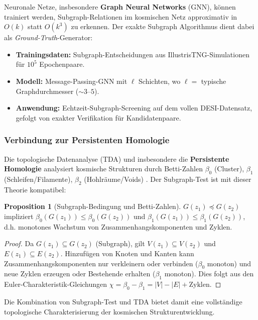 ﻿\documentclass[a4paper,12pt]{article}
\theoremstyle{definition}
\newtheorem{proposition}{Proposition}[section]
\theoremstyle{remark}
\begin{document}
Neuronale Netze, insbesondere \textbf{Graph Neural Networks} (GNN),
können trainiert werden, Subgraph-Relationen im kosmischen Netz
approximativ in $O(k)$ statt $O(k^3)$ zu erkennen. Der exakte
Subgraph Algorithmus dient dabei als \textit{Ground-Truth}-Generator:

\begin{itemize}
  \item \textbf{Trainingsdaten:} Subgraph-Entscheidungen aus IllustrisTNG-Simulationen
    für $10^5$ Epochenpaare.
  \item \textbf{Modell:} Message-Passing-GNN mit $\ell$ Schichten, wo
    $\ell = $ typische Graphdurchmesser ($\sim 3$--$5$).
  \item \textbf{Anwendung:} Echtzeit-Subgraph-Screening auf dem vollen
    DESI-Datensatz, gefolgt von exakter Verifikation für Kandidatenpaare.
\end{itemize}

\subsubsection*{Verbindung zur Persistenten Homologie}

Die topologische Datenanalyse (TDA) und insbesondere die
\textbf{Persistente Homologie} analysiert kosmische Strukturen
durch Betti-Zahlen $\beta_0$ (Cluster), $\beta_1$ (Schleifen/Filamente),
$\beta_2$ (Hohlräume/Voids) \cite{weinberg2013}. Der Subgraph-Test
ist mit dieser Theorie kompatibel:

\begin{proposition}[Subgraph-Bedingung und Betti-Zahlen]
  $G(z_1) \preceq G(z_2)$ impliziert
  $\beta_0(G(z_1)) \leq \beta_0(G(z_2))$ und
  $\beta_1(G(z_1)) \leq \beta_1(G(z_2))$, d.h. monotones Wachstum
  von Zusammenhangskomponenten und Zyklen.
\end{proposition}

\begin{proof}
  Da $G(z_1) \subseteq G(z_2)$ (Subgraph), gilt $V(z_1) \subseteq V(z_2)$
  und $E(z_1) \subseteq E(z_2)$. Hinzufügen von Knoten und Kanten kann
  Zusammenhangskomponenten nur verkleinern oder verbinden ($\beta_0$
  monoton) und neue Zyklen erzeugen oder Bestehende erhalten
  ($\beta_1$ monoton). Dies folgt aus den Euler-Charakteristik-Gleichungen
  $\chi = \beta_0 - \beta_1 = |V| - |E| + \text{Zyklen}$.
\end{proof}

Die Kombination von Subgraph-Test und TDA bietet damit eine vollständige
topologische Charakterisierung der kosmischen Strukturentwicklung.
\end{document}
